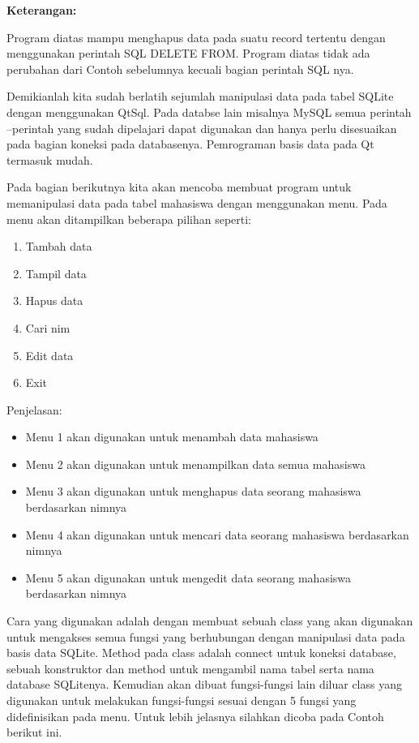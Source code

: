\textbf{Keterangan:}

Program diatas mampu menghapus data pada suatu record tertentu dengan
menggunakan perintah SQL DELETE FROM. Program diatas tidak ada perubahan
dari Contoh sebelumnya kecuali bagian perintah SQL nya.

Demikianlah kita sudah berlatih sejumlah manipulasi data pada tabel
SQLite dengan menggunakan QtSql. Pada databse lain misalnya MySQL semua
perintah --perintah yang sudah dipelajari dapat digunakan dan hanya
perlu disesuaikan pada bagian koneksi pada databasenya. Pemrograman
basis data pada Qt termasuk mudah.

Pada bagian berikutnya kita akan mencoba membuat program untuk
memanipulasi data pada tabel mahasiswa dengan menggunakan menu. Pada
menu akan ditampilkan beberapa pilihan seperti:

\begin{enumerate}


\item
  Tambah data
\item
  Tampil data
\item
  Hapus data
\item
  Cari nim
\item
  Edit data
\item
  Exit
\end{enumerate}

Penjelasan:

\begin{itemize}

\item
  Menu 1 akan digunakan untuk menambah data mahasiswa
\item
  Menu 2 akan digunakan untuk menampilkan data semua mahasiswa
\item
  Menu 3 akan digunakan untuk menghapus data seorang mahasiswa
  berdasarkan nimnya
\item
  Menu 4 akan digunakan untuk mencari data seorang mahasiswa berdasarkan
  nimnya
\item
  Menu 5 akan digunakan untuk mengedit data seorang mahasiswa
  berdasarkan nimnya
\end{itemize}

Cara yang digunakan adalah dengan membuat sebuah class yang akan
digunakan untuk mengakses semua fungsi yang berhubungan dengan
manipulasi data pada basis data SQLite. Method pada class adalah connect
untuk koneksi database, sebuah konstruktor dan method untuk mengambil
nama tabel serta nama database SQLitenya. Kemudian akan dibuat
fungsi-fungsi lain diluar class yang digunakan untuk melakukan
fungsi-fungsi sesuai dengan 5 fungsi yang didefinisikan pada menu. Untuk
lebih jelasnya silahkan dicoba pada Contoh berikut ini.

